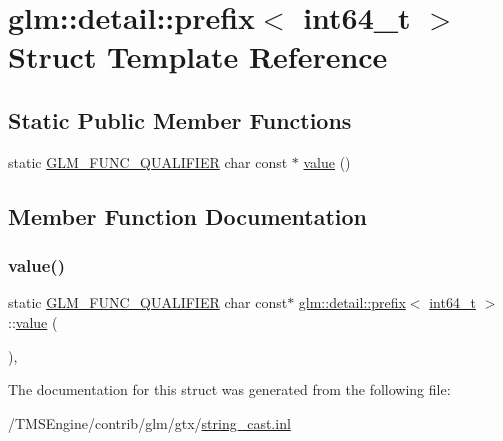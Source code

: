 \hypertarget{structglm_1_1detail_1_1prefix_3_01int64__t_01_4}{}\section{glm\+:\+:detail\+:\+:prefix$<$ int64\+\_\+t $>$ Struct Template Reference}
\label{structglm_1_1detail_1_1prefix_3_01int64__t_01_4}
\subsection*{Static Public Member Functions}
\begin{DoxyCompactItemize}
\item 
static \hyperlink{setup_8hpp_a33fdea6f91c5f834105f7415e2a64407}{G\+L\+M\+\_\+\+F\+U\+N\+C\+\_\+\+Q\+U\+A\+L\+I\+F\+I\+ER} char const  $\ast$ \hyperlink{structglm_1_1detail_1_1prefix_3_01int64__t_01_4_a845043fc18700790972ca73ebc80ac4d}{value} ()
\end{DoxyCompactItemize}


\subsection{Member Function Documentation}
\mbox{\label{structglm_1_1detail_1_1prefix_3_01int64__t_01_4_a845043fc18700790972ca73ebc80ac4d}} 
\subsubsection{\texorpdfstring{value()}{value()}}
{\footnotesize\ttfamily static \hyperlink{setup_8hpp_a33fdea6f91c5f834105f7415e2a64407}{G\+L\+M\+\_\+\+F\+U\+N\+C\+\_\+\+Q\+U\+A\+L\+I\+F\+I\+ER} char const$\ast$ \hyperlink{structglm_1_1detail_1_1prefix}{glm\+::detail\+::prefix}$<$ \hyperlink{group__gtc__type__precision_ga6abb23fbf4e39c50ec5341160b5da5ab}{int64\+\_\+t} $>$\+::\hyperlink{_s_d_l__opengl__glext_8h_a8ad81492d410ff2ac11f754f4042150f}{value} (\begin{DoxyParamCaption}{ }\end{DoxyParamCaption})\hspace{0.3cm}{\ttfamily [inline]}, {\ttfamily [static]}}



The documentation for this struct was generated from the following file\+:\begin{DoxyCompactItemize}
\item 
/\+T\+M\+S\+Engine/contrib/glm/gtx/\hyperlink{string__cast_8inl}{string\+\_\+cast.\+inl}\end{DoxyCompactItemize}
